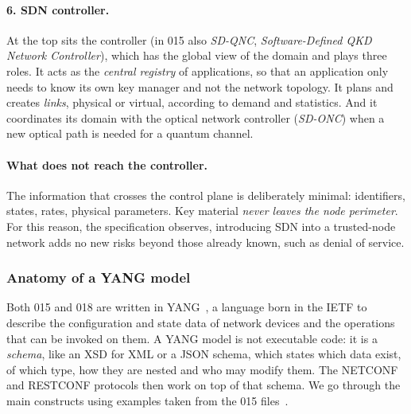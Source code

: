 \paragraph{6. SDN controller.}
At the top sits the controller (in 015 also \emph{SD-QNC},
\emph{Software-Defined QKD Network Controller}), which has the global view
of the domain and plays three roles. It acts as the \emph{central registry}
of applications, so that an application only needs to know its own key
manager and not the network topology. It plans and creates \emph{links},
physical or virtual, according to demand and statistics. And it
coordinates its domain with the optical network controller
(\emph{SD-ONC}) when a new optical path is needed for a quantum channel.

\paragraph{What does not reach the controller.}
The information that crosses the control plane is deliberately minimal:
identifiers, states, rates, physical parameters. Key material \emph{never
leaves the node perimeter}. For this reason, the specification observes,
introducing SDN into a trusted-node network adds no new risks beyond those
already known, such as denial of service.

\subsubsection{Anatomy of a YANG model}
\label{sec:yang-anatomia}

Both 015 and 018 are written in YANG~\cite{rfc7950}, a language born in the
IETF to describe the configuration and state data of network devices and
the operations that can be invoked on them. A YANG model is not executable
code: it is a \emph{schema}, like an XSD for XML or a JSON schema, which
states which data exist, of which type, how they are nested and who may
modify them. The NETCONF and RESTCONF protocols then work on top of that
schema. We go through the main constructs using examples taken from the
015 files~\cite{qkd015yang}.

